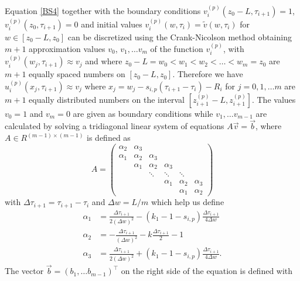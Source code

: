 \documentclass[00main.tex]{subfiles}
\begin{document}
Equation \eqref{BS4} together with the boundary conditions $v_i^{(p)}(z_0-L,\tau_{i+1})=1$, $v_i^{(p)}(z_0,\tau_{i+1})=0$ and initial values $v_i^{(p)}(w,\tau_i)=\tilde{v}(w,\tau_i)$ for $w\in [z_0-L,z_0]$  can be discretized using the Crank-Nicolson method obtaining $m+1$  approximation values $v_0$, $v_1,\hdots v_m$  of the function $v_i^{(p)}$, with  $v_i^{(p)}(w_j,\tau_{i+1})\approx v_j$  and where $z_0 - L=w_0<w_1<w_2<\hdots <w_m=z_0$ are $m+1$  equally spaced numbers on $[z_0-L,z_0]$.  Therefore we have  $u_i^{(p)}(x_j,\tau_{i+1})\approx v_j$ where $x_j = w_j-s_{i,p}(\tau_{i+1}-\tau_i) - R_i$ for $j=0,1, \hdots m$ are $m+1$ equally distributed numbers on the interval $[z_{i+1}^{(p)}-L, z_{i+1}^{(p)}]$. The values $v_0=1$  and $v_m=0$ are given as boundary conditions while $v_1,\hdots v_{m-1}$ are calculated by solving a tridiagonal linear system of equations $A\vec{v} = \vec{b}$,
where $A\in R^{(m-1)\times (m-1)}$ is defined  as
 \[ A = \left( \begin{array}{cccccc}
\alpha_2 & \alpha_3 &   &   &  &  \\
\alpha_1 & \alpha_2 & \alpha_3 &  & &  \\
   & \alpha_1 & \alpha_2 & \alpha_3 &   &    \\
 & & \ddots & \ddots & \ddots & \\
 &  &  & \alpha_1 & \alpha_2 & \alpha_3  \\
 & &   &  & \alpha_1 & \alpha_2 
\end{array} \right) \] 
with $\Delta\tau_{i+1} = \tau_{i+1}-\tau_i$ and $\Delta w = L/m$ which help us define
\begin{align*}
 \alpha_1 &= \frac{\Delta\tau_{i+1}}{2(\Delta w)^2}-(k_1-1-s_{i,p})\frac{\Delta\tau_{i+1}}{4\Delta w} \\
\alpha_2 &=-\frac{\Delta\tau_{i+1}}{(\Delta w)^2}-k\frac{\Delta\tau_{i+1}}{2}-1 \\
 \alpha_3 &= \frac{\Delta\tau_{i+1}}{2(\Delta w)^2}+(k_1-1-s_{i,p})\frac{\Delta\tau_{i+1}}{4\Delta w}.
\end{align*}
The vector $\vec{b}=(b_1,\hdots b_{m-1})^\top$ on the right side of the equation is defined with 
\end{document}

